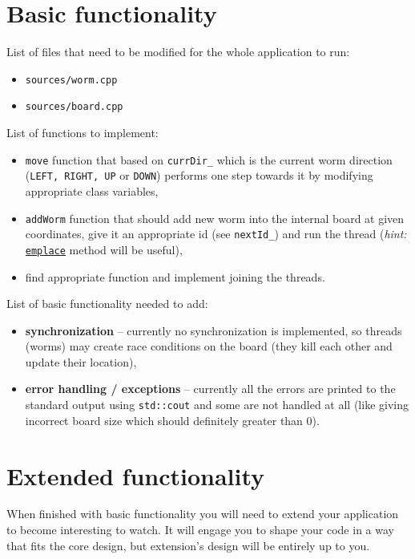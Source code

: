 \documentclass{article}
\begin{document}
\section{Basic functionality}

List of files that need to be modified for the whole application to run:
\begin{itemize}
  \item \texttt{sources/worm.cpp}
  \item \texttt{sources/board.cpp}
\end{itemize}

List of functions to implement:
\begin{itemize}
  \item \texttt{move} function that based on \texttt{currDir\_} which is the
    current worm direction (\texttt{LEFT, RIGHT, UP} or \texttt{DOWN}) performs
    one step towards it by modifying appropriate class variables,
  \item \texttt{addWorm} function that should add new worm into the internal
    board at given coordinates, give it an appropriate id
    (see \texttt{nextId\_}) and run the thread (\textit{hint:}
    \href{https://en.cppreference.com/w/cpp/container/unordered\_map/emplace}{\texttt{emplace}}
    method will be useful),
  \item find appropriate function and implement joining the threads.
\end{itemize}

List of basic functionality needed to add:
\begin{itemize}
  \item \textbf{synchronization} -- currently no synchronization is implemented,
    so threads (worms) may create race conditions on the board (they kill each
    other and update their location),
  \item \textbf{error handling / exceptions} -- currently all the errors are printed to
    the standard output using \texttt{std::cout} and some are
    not handled at all (like giving incorrect board size which should definitely
    greater than $0$).
\end{itemize}

\section{Extended functionality}

When finished with basic functionality you will need to extend your application
to become interesting to watch. It will engage you to shape your code
in a way that fits the core design, but extension's design will be entirely
up to you.
\end{document}

